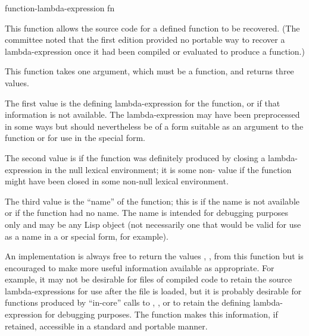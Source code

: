 \begin{defun}[Function]
function-lambda-expression fn

This function allows the
source code for a defined function to be recovered.
(The committee noted that the first edition provided no
portable way to recover a lambda-expression once it had
been compiled or evaluated to produce a function.)

This function takes one argument, which must be a function, and returns
three values.

The first value is the defining lambda-expression for the
function, or {\false} if that information is not available.
The lambda-expression may have been preprocessed in some ways
but should nevertheless be of a form suitable as an argument
to the function  or for use in the  special form.

The second value is {\false} if the function was definitely
produced by closing
a lambda-expression in the null lexical environment; it is some
non-{\false} value if the function might have been closed in some
non-null lexical environment.

The third value is the ``name'' of the function; this is {\false} if the
name is not available or if the function had no name.
The name is intended for debugging purposes only and may be
any Lisp object (not necessarily one that would be valid for use as a name
in a  or  special form, for example).

\beforenoterule
\begin{implementation}
An implementation is always free to return the values
{\false}, , {\false} from this function but is encouraged to
make more useful information available as appropriate.
For example, it may not be desirable for files of compiled code
to retain the source lambda-expressions for use after the file is loaded,
but it is probably desirable for
functions produced by ``in-core'' calls to ,
, or  to retain the defining lambda-expression
for debugging purposes.  The function 
makes this information, if retained, accessible in a standard and portable
manner.
\end{implementation}
\afternoterule
\end{defun}

